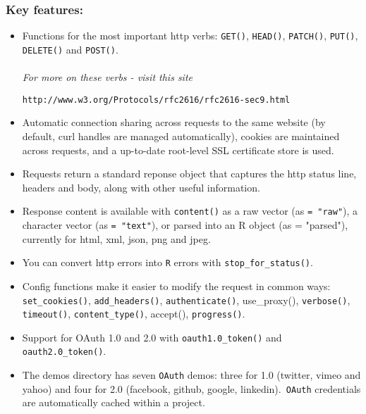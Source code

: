 \documentclass[12pt]{article}
\begin{document}
\subsubsection*{Key features:}
\begin{itemize}
\item Functions for the most important http verbs: \texttt{GET()}, \texttt{HEAD()}, \texttt{PATCH()}, \texttt{PUT()}, \texttt{DELETE()} and \texttt{POST()}.
\\
\\
\textit{For more on these verbs - visit this site}
\begin{verbatim}
http://www.w3.org/Protocols/rfc2616/rfc2616-sec9.html
\end{verbatim}

\item Automatic connection sharing across requests to the same website (by default, curl handles are managed automatically), cookies are maintained across requests, and a up-to-date root-level SSL certificate store is used.

\item Requests return a standard reponse object that captures the http status line, headers and body, along with other useful information.

\item Response content is available with \texttt{content()} as a raw vector (as \texttt{= "raw"}), a character vector (as \texttt{= "text"}), or parsed into an R object (as = "parsed"), currently for html, xml, json, png and jpeg.

\item You can convert http errors into \texttt{R} errors with \texttt{stop\_for\_status()}.

\item Config functions make it easier to modify the request in common ways: \texttt{set\_cookies()}, \texttt{add\_headers()}, \texttt{authenticate()}, use\_proxy(), \texttt{verbose()}, \texttt{timeout()}, \texttt{content\_type()}, accept(), \texttt{progress()}.

\item Support for OAuth 1.0 and 2.0 with \texttt{oauth1.0\_token()} and \texttt{oauth2.0\_token()}. 

\item The demos directory has seven \texttt{OAuth} demos: three for 1.0 (twitter, vimeo and yahoo) and four for 2.0 (facebook, github, google, linkedin).\texttt{ OAuth} credentials are automatically cached within a project.
\end{itemize}
\end{document}
